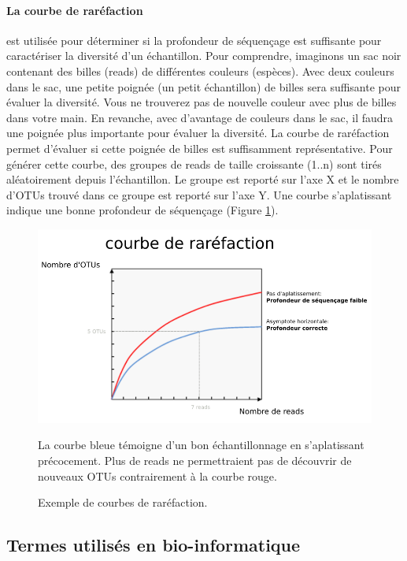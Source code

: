 \documentclass[12pt,a4paper]{article}
\begin{document}
\paragraph{La courbe de raréfaction} est utilisée pour déterminer si la profondeur de séquençage est suffisante pour caractériser la diversité d’un échantillon. Pour comprendre, imaginons un sac noir contenant des billes (reads) de différentes couleurs (espèces). Avec deux couleurs dans le sac, une petite poignée (un petit échantillon) de billes sera suffisante pour évaluer la diversité. Vous ne trouverez pas de nouvelle couleur avec plus de billes dans votre main. En revanche, avec d'avantage de couleurs dans le sac, il faudra une poignée plus importante pour évaluer la diversité. La courbe de raréfaction permet d'évaluer si cette poignée de billes est suffisamment représentative.
Pour générer cette courbe, des groupes de reads de taille croissante (1..n) sont tirés aléatoirement depuis l'échantillon. Le groupe est reporté sur l'axe X et le nombre d'OTUs trouvé dans ce groupe est reporté sur l’axe Y.
Une courbe s’aplatissant indique une bonne profondeur de séquençage (Figure \ref{rarefaction_demo}).


\begin{figure}[ht]
\begin{center}
\includegraphics[scale=0.5]{img/rarefaction_example.png}\hfill
\end{center}
\caption{Exemple de courbes de raréfaction.} La courbe bleue témoigne d'un bon échantillonnage en s’aplatissant précocement. Plus de reads ne permettraient pas de découvrir de nouveaux OTUs contrairement à la courbe rouge.
\label{rarefaction_demo}
\end{figure}

\subsection{Termes utilisés en bio-informatique}
\end{document}
